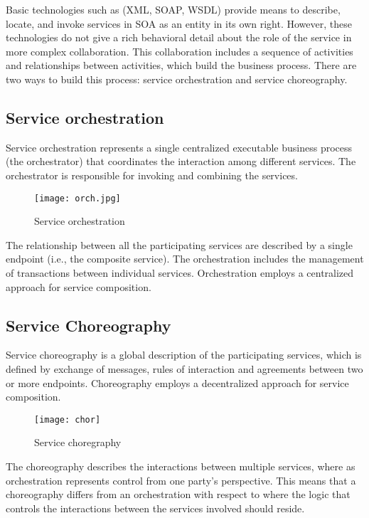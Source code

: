 Basic technologies such as (XML, SOAP, WSDL) provide means to describe, locate,
and invoke services in SOA as an entity in its own right. However, these technologies
do not give a rich behavioral detail about the role of the service in more
complex collaboration. This collaboration includes a sequence of activities and
relationships between activities, which build the business process. There are
two ways to build this process: service orchestration and service choreography.

\subsection{Service orchestration}

Service orchestration represents a single centralized executable business
process (the orchestrator) that coordinates the interaction among different
services. The orchestrator is responsible for invoking and combining the
services.

\begin{figure}[h]
  \centering
  \texttt{[image: orch.jpg]}
  \caption{Service orchestration}
\label{fig:orch}
\end{figure}

The relationship between all the participating services are described by a
single endpoint (i.e., the composite service). The orchestration includes the
management of transactions between individual services. Orchestration employs a
centralized approach for service composition.

\subsection{Service Choreography}

Service choreography is a global description of the participating services,
which is defined by exchange of messages, rules of interaction and agreements
between two or more endpoints. Choreography employs a decentralized approach for
service composition.

\begin{figure}[h]
  \centering
  \texttt{[image: chor]}
  \caption{Service choregraphy}
\label{fig:chor}
\end{figure}

The choreography describes the interactions between multiple services, where as
orchestration represents control from one party's perspective. This means that a
choreography differs from an orchestration with respect to where the logic that
controls the interactions between the services involved should reside.

